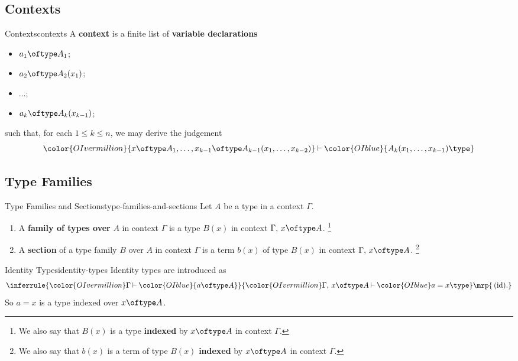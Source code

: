 \subsection{Contexts}\label{subsection-contexts}
\begin{definition}{Contexts}{contexts}%
    A \textbf{context} is a finite list of \textbf{variable declarations}
    \begin{itemize}
        \item $a_{1}\oftype A_{1}$;
        \item $a_{2}\oftype A_{2}(x_{1})$;
        \item $\ldots$;
        \item $a_{k}\oftype A_{k}(x_{k-1})$;
    \end{itemize}
    such that, for each $1\leq k\leq n$, we may derive the judgement
    \[
        {\color{OIvermillion}{x\oftype A_{1},\ldots,x_{k-1}\oftype A_{k-1}(x_{1},\ldots,x_{k-2})}}%
        \mathbin{\vdash}%
        {\color{OIblue}{A_{k}(x_{1},\ldots,x_{k-1})\type}}%
    \]%
\end{definition}
\subsection{Type Families}\label{subsection-type-families}
\begin{definition}{Type Families and Sections}{type-families-and-sections}%
    Let $A$ be a type in a context $\Gamma$.
    \begin{enumerate}
        \item\label{type-families-and-sections-type-families}A \textbf{family of types over} $A$ in context $\Gamma$ is a type $B(x)$ in context $\Gamma,\,x\oftype A$.%
            \footnote{%
                We also say that $B(x)$ is a type \textbf{indexed} by $x\oftype A$ in context $\Gamma$.
            }%
        \item\label{type-families-and-sections-sections}A \textbf{section} of a type family $B$ over $A$ in context $\Gamma$ is a term $b(x)$ of type $B(x)$ in context $\Gamma,\,x\oftype A$.%
            \footnote{%
                We also say that $b(x)$ is a term of type $B(x)$ \textbf{indexed} by $x\oftype A$ in context $\Gamma$.
                \par\vspace*{\TCBBoxCorrection}
            }%
    \end{enumerate}
\end{definition}
\begin{example}{Identity Types}{identity-types}%
    Identity types are introduced as
    \[
        \inferrule{%
            {\color{OIvermillion}\Gamma}\mathbin{\vdash}{\color{OIblue}{a\oftype A}}%
        }{%
            {\color{OIvermillion}\Gamma,\,x\oftype A}\mathbin{\vdash}{{\color{OIblue}a=x\type}}%
        }%
        \mrp{\,(\text{id}).}%
    \]%
    So $a=x$ is a type indexed over $x\oftype A$.
\end{example}
